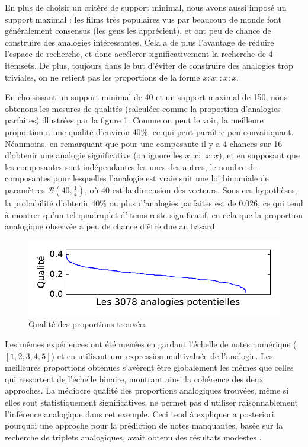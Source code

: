 En plus de choisir un critère de support minimal, nous avons aussi imposé un
support maximal : les films très populaires vus par beaucoup de monde font
généralement consensus (les gens les apprécient), et ont peu de chance de
construire des analogies intéressantes. Cela a de plus l'avantage de réduire
l'espace de recherche, et donc accélerer significativement la recherche de
4-itemsets. De plus, toujours dans le but d'éviter de construire des analogies
trop triviales, on ne retient pas les proportions de la forme $x:x::x:x$.

En choisissant un support minimal de 40 et un support maximal de 150, nous
obtenons les mesures de qualités (calculées comme la proportion d'analogies
parfaites) illustrées par la figure \ref{qualite}. Comme on peut le voir, la
meilleure proportion a une qualité d'environ $40$\%, ce qui peut paraître peu
convainquant. Néanmoins, en remarquant que pour une composante il y a 4 chances
sur 16 d'obtenir une analogie significative (on ignore les $x:x::x:x$), et en supposant que les composantes sont
indépendantes les unes des autres, le nombre de composantes pour lesquelles
l'analogie est vraie suit une loi binomiale de paramètres $\mathcal{B}(40,
\frac{1}{4})$, où $40$ est la dimension des vecteurs. Sous ces hypothèses, la
probabilité d'obtenir $40$\% ou plus d'analogies parfaites est de $0.026$, ce qui
tend à montrer qu'un tel quadruplet d'items reste significatif, en cela que la
proportion analogique observée a peu de chance d'être due au hasard.

\begin{figure}[h]
  \vspace{-0.4cm}
\caption{Qualité des proportions trouvées}
\label{qualite}
\includegraphics[scale=0.6]{figures/quality_of_proportions.pdf}
\vspace{-0.4cm}
\end{figure}
Les mêmes expériences ont été menées en gardant l'échelle de notes numérique
($[1, 2, 3, 4, 5]$) et en utilisant une expression multivaluée de l'analogie.
Les meilleures proportions obtenues s'avèrent être globalement les mêmes que
celles qui ressortent de l'échelle binaire, montrant ainsi la cohérence des
deux approches. La m\'ediocre qualit\'e des proportions analogiques trouv\'ees,
m\^eme si elles sont statistiquement significatives,
ne permet pas d'utiliser raisonnablement l'inf\'erence analogique dans cet exemple.
Ceci  tend \`a expliquer a posteriori pourquoi une approche pour la
pr\'ediction de notes manquantes, bas\'ee sur la recherche de triplets
analogiques, avait obtenu des r\'esultats modestes \cite{HugPraRicISMIS15}.

